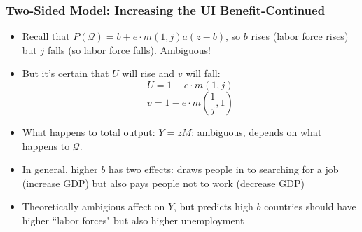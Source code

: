 \documentclass{beamer}
\begin{document}
\begin{frame}
\frametitle[alignment=center]{Two-Sided Model:  Increasing the UI Benefit-Continued}
\begin{itemize}
\item Recall that $P(\mathcal{Q})=b+e\cdot m(1,j)a(z-b)$, so $b$ rises (labor force rises) but $j$ falls (so labor force falls). Ambiguous!
\bigskip
\item But it's certain that $U$ will rise and $v$ will fall:
$$U=1-e\cdot m(1,j)$$
$$v=1-e\cdot m\left(\frac{1}{j},1\right)$$
\item What happens to total output:  $Y=zM$: ambiguous, depends on what happens to $\mathcal{Q}$.
\bigskip
\item In general, higher $b$ has two effects: draws people in to searching for a job (increase GDP) but also pays people not to work (decrease GDP)
\bigskip
\item Theoretically ambigious affect on $Y$, but predicts high $b$ countries should have higher ``labor forces" but also higher unemployment
\end{itemize}
\end{frame}
\end{document}
